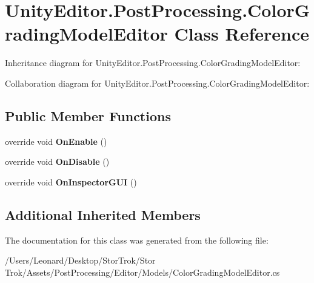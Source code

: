 \hypertarget{class_unity_editor_1_1_post_processing_1_1_color_grading_model_editor}{}\section{Unity\+Editor.\+Post\+Processing.\+Color\+Grading\+Model\+Editor Class Reference}
\label{class_unity_editor_1_1_post_processing_1_1_color_grading_model_editor}


Inheritance diagram for Unity\+Editor.\+Post\+Processing.\+Color\+Grading\+Model\+Editor\+:


Collaboration diagram for Unity\+Editor.\+Post\+Processing.\+Color\+Grading\+Model\+Editor\+:
\subsection*{Public Member Functions}
\begin{DoxyCompactItemize}
\item 
\mbox{\label{class_unity_editor_1_1_post_processing_1_1_color_grading_model_editor_a9304ac2ec59d4c192e9783635da1592e}} 
override void {\bfseries On\+Enable} ()
\item 
\mbox{\label{class_unity_editor_1_1_post_processing_1_1_color_grading_model_editor_aab4148dee7ad4938498e7f12556ebac6}} 
override void {\bfseries On\+Disable} ()
\item 
\mbox{\label{class_unity_editor_1_1_post_processing_1_1_color_grading_model_editor_a72e18f9836c9d26b8ee326d7f9e0f855}} 
override void {\bfseries On\+Inspector\+G\+UI} ()
\end{DoxyCompactItemize}
\subsection*{Additional Inherited Members}


The documentation for this class was generated from the following file\+:\begin{DoxyCompactItemize}
\item 
/\+Users/\+Leonard/\+Desktop/\+Stor\+Trok/\+Stor Trok/\+Assets/\+Post\+Processing/\+Editor/\+Models/Color\+Grading\+Model\+Editor.\+cs\end{DoxyCompactItemize}
